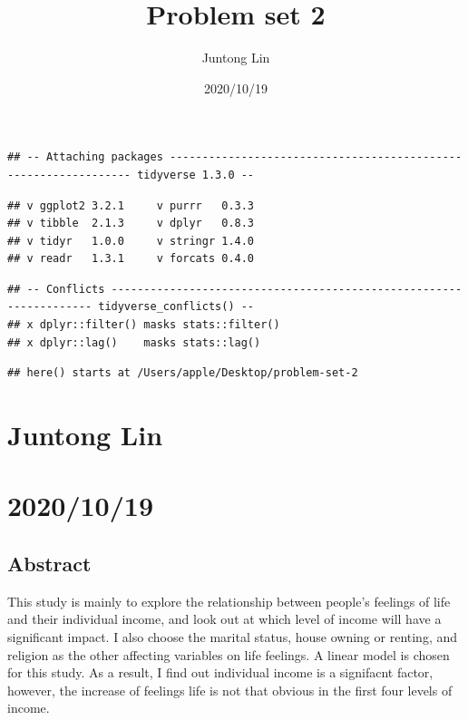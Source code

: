 \documentclass[]{article}
\title{Problem set 2}
\author{Juntong Lin}
\date{2020/10/19}
\begin{document}
\maketitle

\begin{verbatim}
## -- Attaching packages ---------------------------------------------------------------- tidyverse 1.3.0 --
\end{verbatim}

\begin{verbatim}
## v ggplot2 3.2.1     v purrr   0.3.3
## v tibble  2.1.3     v dplyr   0.8.3
## v tidyr   1.0.0     v stringr 1.4.0
## v readr   1.3.1     v forcats 0.4.0
\end{verbatim}

\begin{verbatim}
## -- Conflicts ------------------------------------------------------------------- tidyverse_conflicts() --
## x dplyr::filter() masks stats::filter()
## x dplyr::lag()    masks stats::lag()
\end{verbatim}

\begin{verbatim}
## here() starts at /Users/apple/Desktop/problem-set-2
\end{verbatim}

\hypertarget{juntong-lin}{%
\section{Juntong Lin}\label{juntong-lin}}

\hypertarget{section}{%
\section{2020/10/19}\label{section}}

\hypertarget{abstract}{%
\subsection{Abstract}\label{abstract}}

This study is mainly to explore the relationship between people's
feelings of life and their individual income, and look out at which
level of income will have a significant impact. I also choose the
marital status, house owning or renting, and religion as the other
affecting variables on life feelings. A linear model is chosen for this
study. As a result, I find out individual income is a signifacnt factor,
however, the increase of feelings life is not that obvious in the first
four levels of income.
\end{document}

